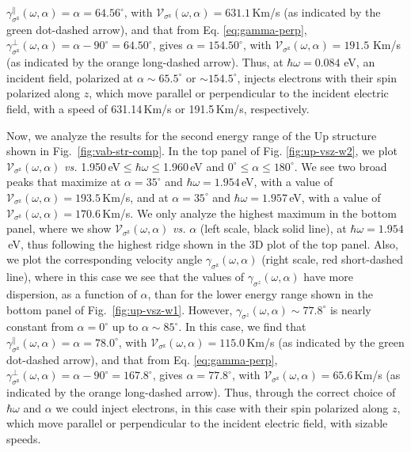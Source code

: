 \documentclass[floatfix,prb,aps,superscriptaddress,showpacs,11pt,preprint,letterpaper]{revtex4}
\begin{document}
$\gamma^\parallel_{\sigma^\mathrm{z}} (\omega,\alpha)=\alpha = 64.56^\circ$,
with $\mathcal{V}_{\sigma^{\mathrm{z}}} (\omega,\alpha) = 631.1$\,Km/s 
(as indicated by the green dot-dashed arrow), and that from Eq. \eqref{eq:gamma-perp},
$\gamma^\perp_{\sigma^\mathrm{z}}(\omega,\alpha)=\alpha-90^\circ=64.50^\circ$,
gives $\alpha=154.50^\circ$, with
$\mathcal{V}_{\sigma^{\mathrm{z}}}(\omega,\alpha) = 191.5$ Km/s 
(as indicated by the orange long-dashed 
arrow). 
Thus, at $\hbar\omega=0.084$ eV, an incident field, polarized at
$\alpha \sim 65.5^\circ$ or $\sim 154.5^\circ$, injects electrons with their
spin polarized along $z$, which move parallel or perpendicular to the incident
electric field,  with a speed of 631.14\,Km/s or 191.5\,Km/s, respectively.

Now, we analyze the results for the second energy range of the Up structure
shown in Fig.~\ref{fig:vab-str-comp}. In the top panel
of Fig. \ref{fig:up-vsz-w2}, we plot $\mathcal{V}_{\sigma^{\mathrm{z}}}
(\omega,\alpha)$ {\it vs.} 1.950\,eV$\leq\hbar\omega\leq$1.960\,eV and
$0^\circ\leq\alpha\leq 180^\circ$. We see two broad peaks that maximize at
$\alpha=35^{\circ}$ and $\hbar\omega= 1.954$\,eV, with a value of
$\mathcal{V}_{\sigma^{\mathrm{z}}}(\omega,\alpha) = 193.5$\,Km/s, and at
$\alpha=35^{\circ}$ and $\hbar\omega= 1.957$\,eV, with a value of
$\mathcal{V}_{\sigma^{\mathrm{z}}}(\omega,\alpha) = 170.6$\,Km/s. We only
analyze the highest  maximum in the bottom panel, where we  show
$\mathcal{V}_{\sigma^{\mathrm{z}}} (\omega,\alpha)$ {\it vs.} $\alpha$ (left scale,
black solid line), at $\hbar\omega= 1.954$\,eV, thus following the highest ridge
shown in the 3D plot of the top panel. Also, we plot the corresponding velocity
angle $\gamma_{\sigma^\mathrm{z}}(\omega,\alpha)$ (right scale, red short-dashed  line),
where in this case we see that the values of $\gamma_{\sigma^z}(\omega,\alpha)$
have more dispersion, as a function of $\alpha$, than for the lower energy
range shown in the bottom panel of Fig.~\ref{fig:up-vsz-w1}. However,
$\gamma_{\sigma^z}(\omega,\alpha)\sim 77.8^\circ$ is nearly constant from
$\alpha=0^\circ$ up to $\alpha\sim 85^\circ$. In this case, we find that
$\gamma^\parallel_{\sigma^\mathrm{z}}(\omega,\alpha)=\alpha=78.0^\circ$, with
$\mathcal{V}_{\sigma^{\mathrm{z}}}(\omega,\alpha) = 115.0$\,Km/s 
(as indicated by the green dot-dashed arrow), and that from Eq. \eqref{eq:gamma-perp},
$\gamma^\perp_{\sigma^\mathrm{z}}(\omega,\alpha)=\alpha-90^\circ=167.8^\circ$,
gives $\alpha=77.8^\circ$, with
$\mathcal{V}_{\sigma^{\mathrm{z}}}(\omega,\alpha) = 65.6$\,Km/s 
(as indicated by the orange long-dashed  arrow). 
Thus, through the correct choice of $\hbar\omega$ and $\alpha$ we could
inject electrons, in this case with their spin polarized along $z$, which move
parallel or perpendicular to the incident electric field, with sizable speeds.
\end{document}
